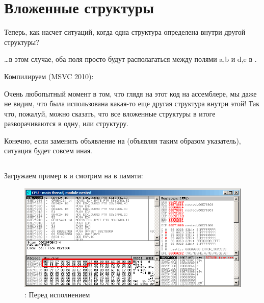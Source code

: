 \section{Вложенные структуры}

Теперь, как насчет ситуаций, когда одна структура определена внутри другой структуры?



\dots в этом случае, оба поля  просто будут располагаться между полями a,b и d,e в 
.

Компилируем (MSVC 2010):



Очень любопытный момент в том, что глядя на этот код на ассемблере, мы даже не видим, 
что была использована какая-то еще другая структура внутри этой!
Так что, пожалуй, можно сказать, что все вложенные структуры в итоге разворачиваются в одну,  
или  структуру.

Конечно, если заменить объявление  на  
(объявляя таким образом указатель), ситуация будет совсем иная.


\clearpage
\subsection{\olly}
\myindex{\olly}

Загружаем пример в \olly и смотрим на 
 в памяти:

\begin{figure}[H]
\centering
\includegraphics[scale=\FigScale]{patterns/15_structs/5_nested/olly.png}
\caption{\olly: Перед исполнением \printf}
\label{fig:nested_olly}
\end{figure}

